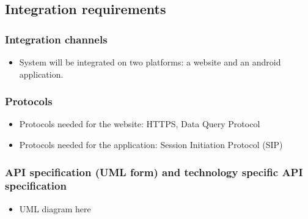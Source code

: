 \documentclass[11pt]{article}
\begin{document}
\subsection{Integration requirements}

	\subsubsection{Integration channels}
		\begin{itemize}
			\item System will be integrated on two platforms: a website and an android application.
		\end{itemize}
	
	\subsubsection{Protocols}
		\begin{itemize}
			\item Protocols needed for the website:  HTTPS, Data Query Protocol
			\item Protocols needed for the application: Session Initiation Protocol (SIP)
		\end{itemize}
	
	\subsubsection{API specification (UML form) and technology specific API specification}
		\begin{itemize}
			\item UML diagram here
		\end{itemize}
	
\end{document}
